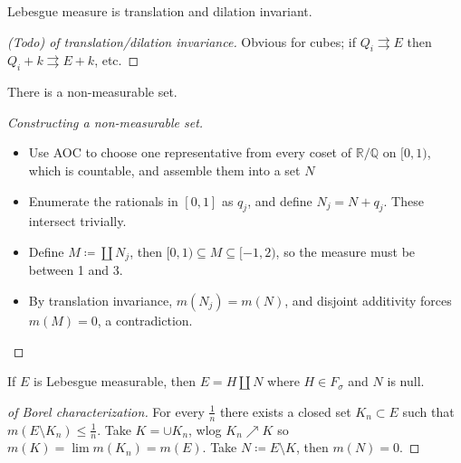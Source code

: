 \begin{proposition}

Lebesgue measure is translation and dilation invariant.

\end{proposition}

\begin{proof}[(Todo) of translation/dilation invariance]

Obvious for cubes; if \(Q_{i} \rightrightarrows E\) then
\(Q_{i} + k \rightrightarrows E + k\), etc.

\end{proof}

\begin{theorem}

There is a non-measurable set.

\end{theorem}

\begin{proof}[Constructing a non-measurable set]

\envlist

\begin{itemize}
\tightlist
\item
  Use AOC to choose one representative from every coset of
  \({\mathbb{R}}/{\mathbb{Q}}\) on \([0, 1)\), which is countable, and
  assemble them into a set \(N\)
\item
  Enumerate the rationals in \([0, 1]\) as \(q_{j}\), and define
  \(N_{j} = N + q_{j}\). These intersect trivially.
\item
  Define \(M \coloneqq{\coprod}N_{j}\), then
  \([0, 1) \subseteq M \subseteq [-1, 2)\), so the measure must be
  between 1 and 3.
\item
  By translation invariance, \(m(N_{j}) = m(N)\), and disjoint
  additivity forces \(m(M) = 0\), a contradiction.
\end{itemize}

\end{proof}

\begin{proposition}

If \(E\) is Lebesgue measurable, then \(E = H {\coprod}N\) where
\(H \in F_\sigma\) and \(N\) is null.

\end{proposition}

\begin{proof}[of Borel characterization]

For every \(\frac 1 n\) there exists a closed set \(K_{n} \subset E\)
such that \(m(E\setminus K_{n}) \leq \frac 1 n\). Take
\(K = \cup K_{n}\), wlog \(K_{n} \nearrow K\) so
\(m(K) = \lim m(K_{n}) = m(E)\). Take \(N\coloneqq E\setminus K\), then
\(m(N) = 0\).

\end{proof}

